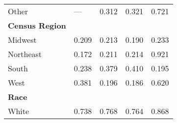 {\begin{tabular}{L{5.5cm} C{3.5cm} C{3.5cm} C{3.5cm} C{4cm}}
                          Other                           &                           ---                            &                          0.312                           &                          0.321                           &                          0.721                            \\
\textbf{Census Region}                                    &                                                          &                                                          &                                                          &                                                           \\
                         Midwest                          &                          0.209                           &                          0.213                           &                          0.190                           &                          0.233                            \\
                        Northeast                         &                          0.172                           &                          0.211                           &                          0.214                           &                          0.921                            \\
                          South                           &                          0.238                           &                          0.379                           &                          0.410                           &                          0.195                            \\
                           West                           &                          0.381                           &                          0.196                           &                          0.186                           &                          0.620                            \\
\textbf{Race}                                             &                                                          &                                                          &                                                          &                                                           \\
                          White                           &                          0.738                           &                          0.768                           &                          0.764                           &                          0.868                            \\

\end{tabular}}
